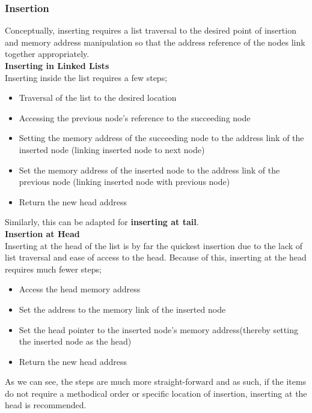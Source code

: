 \documentclass[hidelinks,11pt]{article}
\begin{document}
\subsubsection{Insertion}
Conceptually, inserting requires a list traversal to the desired point of insertion and memory address manipulation so that the address reference of the nodes link together appropriately.\\[0.5\baselineskip]
\textbf{Inserting in Linked Lists}\\
Inserting inside the list requires a few steps;
\begin{itemize}
    \item Traversal of the list to the desired location
    \item Accessing the previous node's reference to the succeeding node
    \item Setting the memory address of the succeeding node to the address link of the inserted node (linking inserted node to next node)
    \item Set the memory address of the inserted node to the address link of the previous node (linking inserted node with previous node)
    \item Return the new head address
\end{itemize}
Similarly, this can be adapted for \textbf{inserting at tail}.\\[.5 \baselineskip]
\textbf{Insertion at Head}\\
Inserting at the head of the list is by far the quickest insertion due to the lack of list traversal and ease of access to the head. Because of this, inserting at the head requires much fewer steps;
\begin{itemize}
    \item Access the head memory address
    \item Set the address to the memory link of the inserted node
    \item Set the head pointer to the inserted node's memory address(thereby setting the inserted node as the head)
    \item Return the new head address
\end{itemize}
As we can see, the steps are much more straight-forward and as such, if the items do not require a methodical order or specific location of insertion, inserting at the head is recommended.
\end{document}
